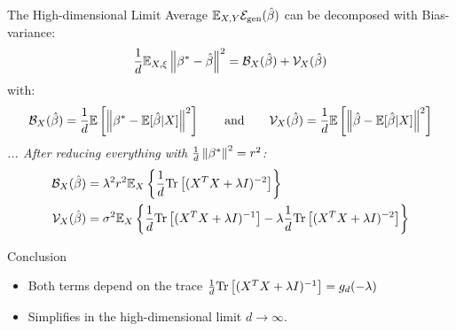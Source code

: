 \documentclass[10pt]{beamer}
\begin{document}
\begin{frame}{The High-dimensional Limit}
  Average $\mathbb E_{X,Y} \mathcal E_{\text{gen}}(\hat \beta)$ can be decomposed with Bias-variance:
\begin{align}
  \frac{1}{d} \mathbb E_{X,\xi} \left\lVert\beta^*-\hat \beta\right\rVert^2 = \mathcal B_X(\hat \beta) +  \mathcal V_X(\hat \beta)
\end{align}
with:
\begin{equation*}
  \mathcal B_X(\hat \beta) = \frac{1}{d} \mathbb E\left[ \left\lVert \beta^* - \mathbb E[\hat \beta|X]\right\rVert^2 \right]
  \qquad \text{and} \qquad
  \mathcal V_X(\hat \beta) = \frac{1}{d}  \mathbb E\left[  \left\lVert \hat \beta - \mathbb E[\hat \beta|X]\right\rVert^2 \right]
\end{equation*}
\emph{... After reducing everything with $ \frac{1}{d}\left\lVert\beta^*\right\rVert^2 = r^2$:}
\begin{align}\label{eq:simple-bias}
  \mathcal B_X(\hat \beta) 
  & = \lambda^2 r^2 \mathbb E_X \left\{ \frac{1}{d} \text{Tr}\left[ (X^T X + \lambda I)^{-2} \right] \right\}\\
  \mathcal V_X(\hat \beta)
  & = \sigma^2  \mathbb E_X \left\{ \frac{1}{d} \text{Tr}\left[ (X^T X + \lambda I)^{-1}\right] - \lambda \frac{1}{d}\text{Tr}\left[(X^T X + \lambda I)^{-2}\right] \right\}
\end{align}
\begin{alertblock}{Conclusion}
  \begin{itemize}
    \item Both terms depend on the trace
    $\frac{1}{d}\text{Tr}\left[(X^T X + \lambda I)^{-1}\right]= g_d(-\lambda) $
    \item Simplifies in the high-dimensional limit $d \to \infty$.
  \end{itemize}
\end{alertblock}
\end{frame}
\end{document}
